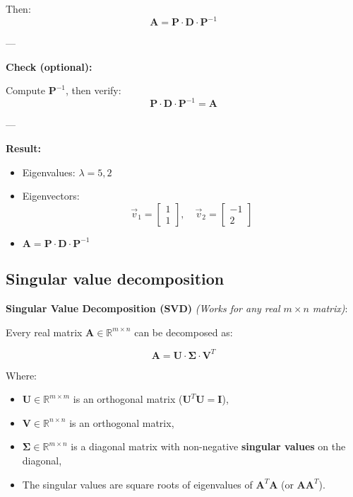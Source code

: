 Then:
\[
\textbf{A} = \textbf{P} \cdot \textbf{D} \cdot \textbf{P}^{-1}
\]

---

\textbf{Check (optional):}

Compute \(\textbf{P}^{-1}\), then verify:
\[
\textbf{P} \cdot \textbf{D} \cdot \textbf{P}^{-1} = \textbf{A}
\]

---

\textbf{Result:}

\begin{itemize}
    \item Eigenvalues: \(\lambda = 5, 2\)
    \item Eigenvectors:
    \[
    \vec{v}_1 =
    \begin{bmatrix}
    1 \\
    1
    \end{bmatrix}, \quad
    \vec{v}_2 =
    \begin{bmatrix}
    -1 \\
    2
    \end{bmatrix}
    \]
    \item \(\textbf{A} = \textbf{P} \cdot \textbf{D} \cdot \textbf{P}^{-1}\)
\end{itemize}

\subsection{Singular value decomposition}

\textbf{Singular Value Decomposition (SVD)} \textit{(Works for any real \( m \times n \) matrix)}:

Every real matrix \(\textbf{A} \in \mathbb{R}^{m \times n}\) can be decomposed as:

\[
\textbf{A} = \textbf{U} \cdot \boldsymbol{\Sigma} \cdot \textbf{V}^T
\]

Where:
\begin{itemize}
    \item \(\textbf{U} \in \mathbb{R}^{m \times m}\) is an orthogonal matrix (\(\textbf{U}^T \textbf{U} = \textbf{I}\)),
    \item \(\textbf{V} \in \mathbb{R}^{n \times n}\) is an orthogonal matrix,
    \item \(\boldsymbol{\Sigma} \in \mathbb{R}^{m \times n}\) is a diagonal matrix with non-negative \textbf{singular values} on the diagonal,
    \item The singular values are square roots of eigenvalues of \(\textbf{A}^T\textbf{A}\) (or \(\textbf{A}\textbf{A}^T\)).
\end{itemize}

